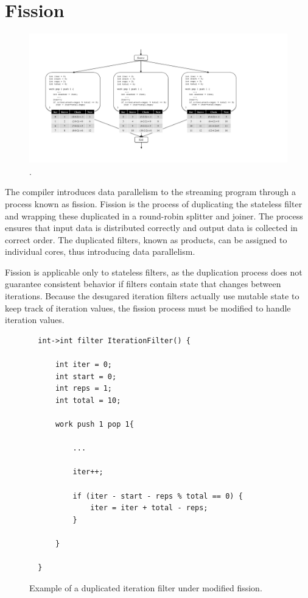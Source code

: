 \section{Fission}
\label{sec:fission}


\begin{figure}[t!]
\centering
\includegraphics[width=6.5in]{figures/fission-example.pdf}
\caption{.\protect\label{fig:fission-example}}
\end{figure}


The compiler introduces data parallelism to the streaming program through a process known as fission.  Fission is the process of duplicating the stateless filter and wrapping these duplicated in a round-robin splitter and joiner.  The process ensures that input data is distributed correctly and output data is collected in correct order.  The duplicated filters, known as products, can be assigned to individual cores, thus introducing data parallelism.  

Fission is applicable only to stateless filters, as the duplication process does not guarantee consistent behavior if filters contain state that changes between iterations.  Because the desugared iteration filters actually use mutable state to keep track of iteration values, the fission process must be modified to handle iteration values.  

\begin{figure}[t]
{\eightpoint
\begin{verbatim}
  int->int filter IterationFilter() {

      int iter = 0;
      int start = 0;
      int reps = 1;
      int total = 10;

      work push 1 pop 1{

          ...

          iter++;

          if (iter - start - reps % total == 0) {
              iter = iter + total - reps;
          }

      }

  }
\end{verbatim}
\caption{Example of a duplicated iteration filter under modified fission.\protect\label{fig:modified-fission-filter-example}}}
\end{figure}


